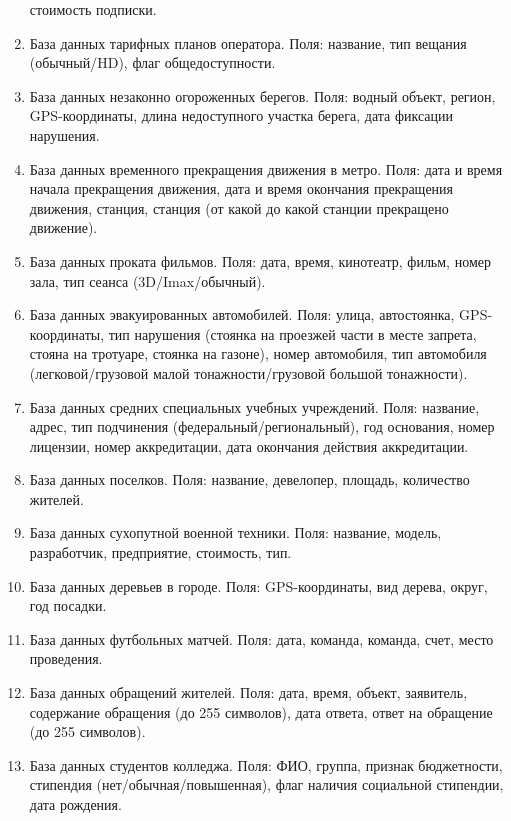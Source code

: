 \begin{enumerate}
стоимость подписки. 
	\item База данных тарифных планов оператора. Поля: название, тип вещания (обычный/HD), флаг общедоступности. 
	\item База данных незаконно огороженных берегов. Поля: водный объект, регион, GPS-координаты, длина недоступного участка берега, дата фиксации нарушения.
	\item База данных временного прекращения движения в метро. Поля: дата и время начала прекращения
движения, дата и время окончания прекращения движения, станция, станция (от какой до какой станции прекращено движение).
	\item База данных проката фильмов. Поля: дата, время, кинотеатр, фильм, номер зала, тип сеанса (3D/Imax/обычный).
	\item База данных эвакуированных автомобилей. Поля: улица, автостоянка, GPS-координаты, 
тип нарушения (стоянка на проезжей части в месте запрета, стояна на тротуаре, стоянка на газоне), 
номер автомобиля, тип автомобиля (легковой/грузовой малой тонажности/грузовой большой
тонажности). 
	\item База данных средних специальных учебных учреждений. Поля: название, адрес, тип подчинения (федеральный/региональный), 
год основания, номер лицензии, номер аккредитации, дата окончания действия аккредитации. 
	\item База данных поселков. Поля: название, девелопер, площадь, количество жителей.
	\item База данных сухопутной военной техники. Поля: название, модель, разработчик, предприятие, стоимость, тип. 
	\item База данных деревьев в городе. Поля: GPS-координаты, вид дерева, округ, год посадки. 
	\item База данных футбольных матчей. Поля: дата, команда, команда, счет, место проведения. 
	\item База данных обращений жителей. Поля: дата, время, объект, заявитель, содержание обращения (до 255 символов), 
дата ответа, ответ на обращение (до 255 символов).
	\item База данных студентов колледжа. Поля: ФИО, группа, признак бюджетности, 
стипендия (нет/обычная/повышенная), флаг наличия социальной стипендии, дата рождения.
\end{enumerate}

